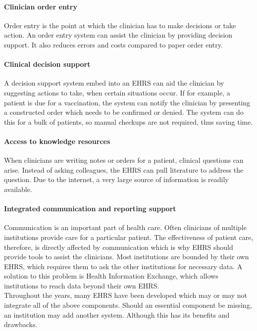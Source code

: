         \paragraph{Clinician order entry} Order entry is the point at which the clinician has to make decisions or take action. An order entry system can assist the clinician by providing decision support. It also reduces errors and costs compared to paper order entry.

        \paragraph{Clinical decision support} A decision support system embed into an EHRS can aid the clinician by suggesting actions to take, when certain situations occur. If for example, a patient is due for a vaccination, the system can notify the clinician by presenting a constructed order which needs to be confirmed or denied. The system can do this for a bulk of patients, so manual checkups are not required, thus saving time.

        \paragraph{Access to knowledge resources} When clinicians are writing notes or orders for a patient, clinical questions can arise. Instead of asking colleagues, the EHRS can pull literature to address the question. Due to the internet, a very large source of information is readily available.

        \paragraph{Integrated communication and reporting support} Communication is an important part of health care. Often clinicians of multiple institutions provide care for a particular patient. The effectiveness of patient care, therefore, is directly affected by communication which is why EHRS should provide tools to assist the clinicians. Most institutions are bounded by their own EHRS, which requires them to ask the other institutions for necessary data. A solution to this problem is Health Information Exchange, which allows institutions to reach data beyond their own EHRS.\\
        
        \noindent Throughout the years, many EHRS have been developed which may or may not integrate all of the above components. Should an essential component be missing, an institution may add another system. Although this has its benefits and drawbacks.

